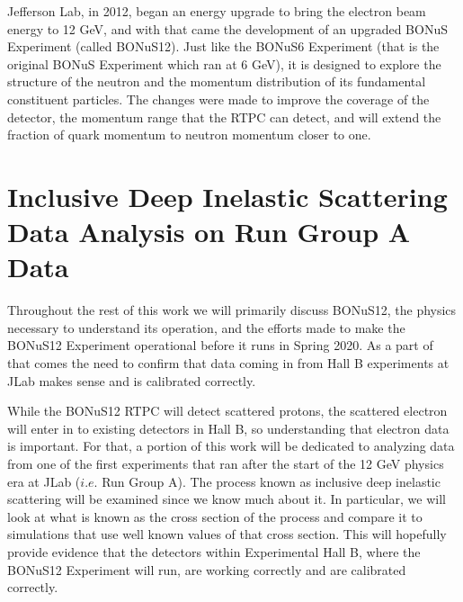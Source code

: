  Jefferson Lab, in 2012, began an energy upgrade to bring the electron beam energy to 12 GeV, and with that came the development of an upgraded BONuS Experiment (called BONuS12). Just like the BONuS6 Experiment (that is the original BONuS Experiment which ran at 6 GeV), it is designed to explore the structure of the neutron and the momentum distribution of its fundamental constituent particles. The changes were made to improve the coverage of the detector, the momentum range that the RTPC can detect, and will extend the fraction of quark momentum to neutron momentum closer to one.
 
\section{Inclusive Deep Inelastic Scattering Data Analysis on Run Group A Data}
Throughout the rest of this work we will primarily discuss BONuS12, the physics necessary to understand its operation, and the efforts made to make the BONuS12 Experiment operational before it runs in Spring 2020. As a part of that comes the need to confirm that data coming in from Hall B experiments at JLab makes sense and is calibrated correctly. 

While the BONuS12 RTPC will detect scattered protons, the scattered electron will enter in to existing detectors in Hall B, so understanding that electron data is important. For that, a portion of this work will be dedicated to analyzing data from one of the first experiments that ran after the start of the 12 GeV physics era at JLab ($i.e.$ Run Group A). The process known as inclusive deep inelastic scattering will be examined since we know much about it. In particular, we will look at what is known as the cross section of the process and compare it to simulations that use well known values of that cross section. This will hopefully provide evidence that the detectors within Experimental Hall B, where the BONuS12 Experiment will run, are working correctly and are calibrated correctly.